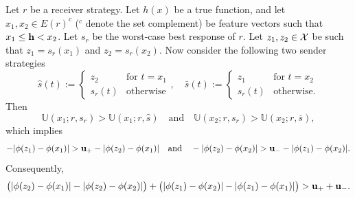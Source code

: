 \begin{lem}\label{lem:helping lemma}
	Let $r$ be a receiver strategy. Let $h(x)$ be a true function, and let $x_1, x_2 \in E(r)^c$ ($^c$ denote the set complement) be feature vectors such that $x_1 \leq \mathbf{h} < x_2$. Let $s_r$ be the worst-case best response of $r$. Let $z_1,z_2 \in \mathcal{X}$ be such that $z_1 = s_r(x_1)$ and $z_2 = s_r(x_2)$. Now consider the following two sender strategies \begin{equation}\label{eqn:s hat and s bar}
		\hat{s}(t) :=
		\begin{cases}
			z_2 & \text{for } t = x_1  \\
			s_{r}(t) & \text{otherwise}
		\end{cases},\quad
		\bar{s}(t) :=
		\begin{cases}
			z_1 & \text{for } t = x_2 \\
			s_{r}(t) & \text{otherwise}.
		\end{cases}
	\end{equation}
Then
\begin{equation}\label{eqn:helping lemma payoffs}
	\mathbb{U}(x_1;r,s_r) > \mathbb{U}(x_1;r,\hat{s}) \quad \text{and} \quad \mathbb{U}(x_2;r,s_r) > \mathbb{U}(x_2;r,\bar{s}),
\end{equation}
which implies
\begin{equation*}\label{eqn:helping lemma ineq}
	-|\phi(z_1) - \phi(x_1)| > \mathbf{u_+} -|\phi(z_2) - \phi(x_1)| \quad \text{and} \quad -|\phi(z_2) - \phi(x_2)| > \mathbf{u_-} - |\phi(z_1) - \phi(x_2)|.
\end{equation*}
Consequently,
\begin{equation}\label{eqn:helping lemma sum}
	\big(|\phi(z_2) - \phi(x_1)| - |\phi(z_2) - \phi(x_2)|\big) + \big(|\phi(z_1) - \phi(x_2)| - |\phi(z_1) - \phi(x_1)|\big) > \mathbf{u_+} + \mathbf{u_-}.
\end{equation}
\end{lem}

